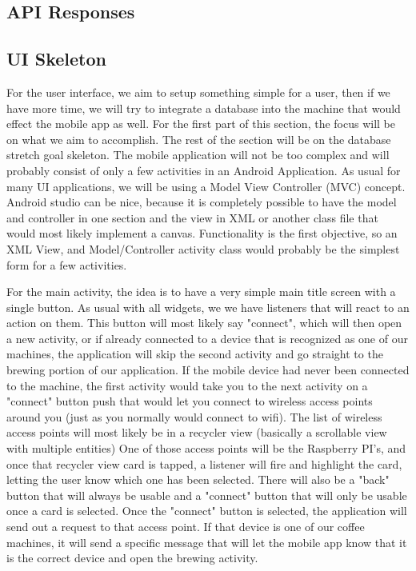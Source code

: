 \documentclass[conference]{IEEEtran}
\begin{document}
\begin{itemize}
\subsection{API Responses}

\subsection{UI Skeleton}
For the user interface, we aim to setup something simple for a user, then if we
have more time, we will try to integrate a database into the machine that would
effect the mobile app as well. For the first part of this section, the focus will be
on what we aim to accomplish. The rest of the section will be on the database
stretch goal skeleton. The mobile application will not be too complex and will
probably consist of only a few activities in an Android Application. As usual
for many UI applications, we will be using a Model View Controller (MVC)     
concept.  Android studio can be nice, because it is completely possible to have
the model and controller in one section and the view in XML or another class
file that would most likely implement a canvas. Functionality is the first
objective, so an XML View, and Model/Controller activity class would probably
be the simplest form for a few activities.

For the main activity, the idea is to have a very simple main title screen
with a single button. As usual with all widgets, we we have listeners that will
react to an action on them. This button will most likely say "connect", which
will then open a new activity, or if already connected to a device that is
recognized as one of our machines, the application will skip the second
activity and go straight to the brewing portion of our application. 
If the mobile device had never been connected to the machine, the first
activity would take you to the next activity on a "connect" button push that
would let you connect to wireless access points around you (just as you
normally would connect to wifi). The list of wireless access points will most
likely be in a recycler view (basically a scrollable view with multiple
entities) One of those access points will be the Raspberry PI's, and once that
recycler view card is tapped, a listener will fire and highlight the card,
letting the user know which one has been selected. There will also be a "back"
button that will always be usable and a "connect" button that will only be
usable once a card is selected. Once the "connect" button is selected, the
application will send out a request to that access point. If that device is one
of our coffee machines, it will send a specific message that will let the
mobile app know that it is the correct device and open the brewing activity.


\end{itemize}
\end{document}
